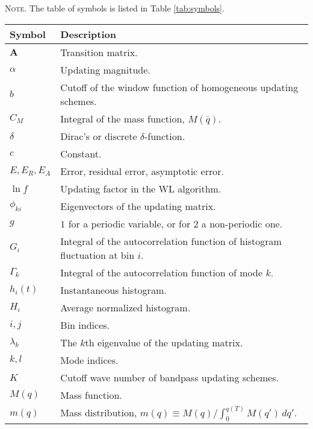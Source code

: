 \documentclass[reprint, superscriptaddress, floatfix]{revtex4-1}
\newcommand{\note}[1]{{\color{DarkGreen}\footnotesize \textsc{Note.} #1}}
\newcommand{\Err}{E}
\begin{document}
\note{The table of symbols is listed in Table \ref{tab:symbols}.
  \begin{table*}
  \footnotesize
  \centering
  \rowcolors{1}{white}{LightGray}
  \setlength{\tabcolsep}{4pt} %
  \caption{\label{tab:symbols}
    Table of symbols.}
  \begin{tabular}{l | p{12cm} }
    Symbol          &   Description \\
    \hline
    $\mathbf{A}$    &   Transition matrix. \\
    $\alpha$        &   Updating magnitude. \\
    $b$             &   Cutoff of the window function of homogeneous updating schemes. \\
    $C_M$           &   Integral of the mass function, $M(\bar q)$.  \\
    $\delta$        &   Dirac's or discrete $\delta$-function. \\
    $c$             &   Constant. \\
    $\Err, \Err_R, \Err_A$          &   Error, residual error, asymptotic error. \\
    $\ln f$         &   Updating factor in the WL algorithm.  \\
    $\phi_{ki}$     &   Eigenvectors of the updating matrix. \\
    $g$             &   $1$ for a periodic variable, or for $2$ a non-periodic one. \\
    $G_i$           &   Integral of the autocorrelation function of histogram fluctuation at bin $i$. \\
    $\Gamma_k$      &   Integral of the autocorrelation function of mode $k$. \\
    $h_i(t)$        &   Instantaneous histogram.  \\
    $H_i$           &   Average normalized histogram.  \\
    $i, j$          &   Bin indices. \\
    $\lambda_k$     &   The $k$th eigenvalue of the updating matrix. \\
    $k, l$          &   Mode indices. \\
    $K$             &   Cutoff wave number of bandpass updating schemes.  \\
    $M(q)$          &   Mass function.   \\
    $m(q)$          &   Mass distribution,
                        $m(q) \equiv M(q)/\int_0^{ q(T) } M(q') \, dq'$.  \\

\end{tabular}
\end{table*}}
\end{document}
